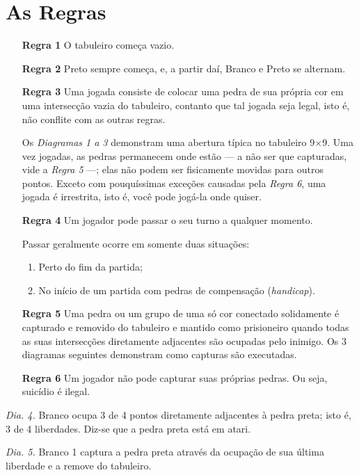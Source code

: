 \chapter{As Regras}\label{chap:regras}

\begin{itemize}
    \item[\textbf{Regra 1}] O tabuleiro começa vazio.
    \item[\textbf{Regra 2}] Preto sempre começa, e, a partir daí, Branco e Preto se alternam. 
    \item[\textbf{Regra 3}] Uma jogada consiste de colocar uma pedra de sua própria cor em uma intersecção vazia do tabuleiro, contanto que tal jogada seja legal, isto é, não conflite com as outras regras.
        
    Os \emph{Diagramas 1 a 3} demonstram uma abertura típica no tabuleiro 9\(\times\)9. Uma vez jogadas, as pedras permanecem onde estão --- a não ser que capturadas, vide a \emph{Regra 5} ---; elas não podem ser fisicamente movidas para outros pontos. Exceto com pouquíssimas exceções causadas pela \emph{Regra 6}, uma jogada é irrestrita, isto é, você pode jogá-la onde quiser.
    \item[\textbf{Regra 4}] Um jogador pode passar o seu turno a qualquer momento.
    
    Passar geralmente ocorre em somente duas situações:
        
    \begin{enumerate}
        \item Perto do fim da partida;
        \item No início de um partida com pedras de compensação (\emph{handicap}).
    \end{enumerate}
    \item[\textbf{Regra 5}] Uma pedra ou um grupo de uma só cor conectado solidamente é capturado e removido do tabuleiro e mantido como prisioneiro quando todas as suas intersecções diretamente adjacentes são ocupadas pelo inimigo. Os 3 diagramas seguintes demonstram como capturas são executadas.
    \item[\textbf{Regra 6}] Um jogador não pode capturar suas próprias pedras. Ou seja, suicídio é ilegal.
\end{itemize}

\emph{Dia. 4.} Branco ocupa 3 de 4 pontos diretamente adjacentes à pedra preta; isto é, 3 de 4 liberdades. Diz-se que a pedra preta está em atari.

\emph{Dia. 5.} Branco 1 captura a pedra preta através da ocupação de sua última liberdade e a remove do tabuleiro.

